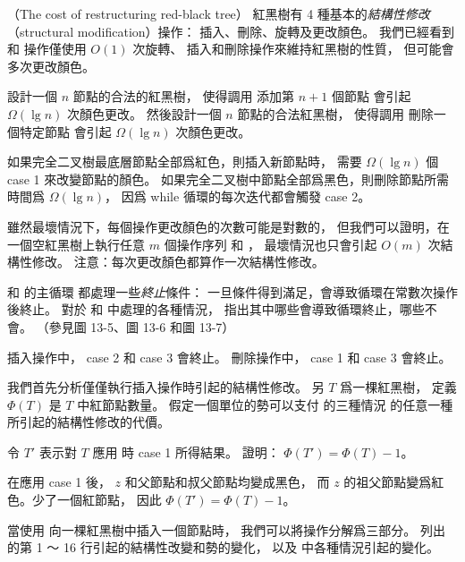 \startPROBLEM
（The cost of restructuring red-black tree）
紅黑樹有 4 種基本的\emph{結構性修改}（structural modification）操作：
插入、刪除、旋轉及更改顏色。
我們已經看到  和  操作僅使用 $O(1)$ 次旋轉、
插入和刪除操作來維持紅黑樹的性質，
但可能會多次更改顏色。

\startigBase[a]\startitem
設計一個 $n$ 節點的合法的紅黑樹，
使得調用  添加第 $n+1$ 個節點
會引起 $\Omega(\lg n)$ 次顏色更改。
然後設計一個 $n$ 節點的合法紅黑樹，
使得調用  刪除一個特定節點
會引起 $\Omega(\lg n)$ 次顏色更改。
\stopitem\stopigBase

\startANSWER
如果完全二叉樹最底層節點全部爲紅色，則插入新節點時，
需要 $\Omega(\lg n)$ 個 case 1 來改變節點的顏色。
如果完全二叉樹中節點全部爲黑色，則刪除節點所需時間爲 $\Omega(\lg n)$，
因爲 while 循環的每次迭代都會觸發 case 2。
\stopANSWER

雖然最壞情況下，每個操作更改顏色的次數可能是對數的，
但我們可以證明，在一個空紅黑樹上執行任意 $m$ 個操作序列
  和 ，
最壞情況也只會引起 $O(m)$ 次結構性修改。
注意：每次更改顏色都算作一次結構性修改。

\startigBase[continue]\startitem
{} 和  的主循環
都處理一些\emph{終止}條件：
一旦條件得到滿足，會導致循環在常數次操作後終止。
對於  和  中處理的各種情況，
指出其中哪些會導致循環終止，哪些不會。
（\hint 參見圖 13-5、圖 13-6 和圖 13-7）
\stopitem\stopigBase

\startANSWER
插入操作中， case 2 和 case 3 會終止。
刪除操作中， case 1 和 case 3 會終止。
\stopANSWER

我們首先分析僅僅執行插入操作時引起的結構性修改。
另 $T$ 爲一棵紅黑樹，
定義 $\Phi(T)$ 是 $T$ 中紅節點數量。
假定一個單位的勢可以支付  的三種情況
的任意一種所引起的結構性修改的代價。

\startigBase[continue]\startitem
令 $T'$ 表示對 $T$ 應用  時 case 1 所得結果。
證明： $\Phi(T')=\Phi(T) - 1$。
\stopitem\stopigBase

\startANSWER
在應用 case 1 後， $z$ 和父節點和叔父節點均變成黑色，
而 $z$ 的祖父節點變爲紅色。少了一個紅節點，
因此 $\Phi(T')=\Phi(T) - 1$。
\stopANSWER

\startigBase[continue]\startitem
當使用  向一棵紅黑樹中插入一個節點時，
我們可以將操作分解爲三部分。
列出  的第 1 ～ 16 行引起的結構性改變和勢的變化，
以及  中各種情況引起的變化。
\stopitem\stopigBase

